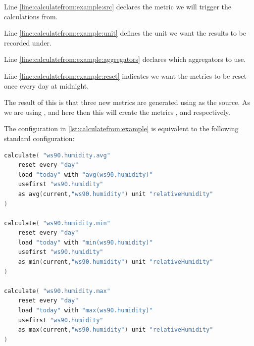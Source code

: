 Line \ref{line:calculatefrom:example:src} declares the metric we will trigger the calculations from.

Line \ref{line:calculatefrom:example:unit} defines the unit we want the results to be recorded under.

Line \ref{line:calculatefrom:example:aggregators} declares which aggregators to use.

Line \ref{line:calculatefrom:example:reset} indicates we want the metrics to be reset once every day at midnight.

The result of this is that three new metrics are generated using  as the source.
As we are using ,  and  here then this will create the metrics
,  and  respectively.

The configuration in \vref{lst:calculatefrom:example} is equivalent to the following standard configuration:

\begin{lstlisting}[language=Go,caption={calculation for example expanded},escapechar=|,label=lst:calculatefrom:expanded]
calculate( "ws90.humidity.avg"
    reset every "day"
    load "today" with "avg(ws90.humidity)"
    usefirst "ws90.humidity"
    as avg(current,"ws90.humidity") unit "relativeHumidity"
)

calculate( "ws90.humidity.min"
    reset every "day"
    load "today" with "min(ws90.humidity)"
    usefirst "ws90.humidity"
    as min(current,"ws90.humidity") unit "relativeHumidity"
)

calculate( "ws90.humidity.max"
    reset every "day"
    load "today" with "max(ws90.humidity)"
    usefirst "ws90.humidity"
    as max(current,"ws90.humidity") unit "relativeHumidity"
)

\end{lstlisting}
